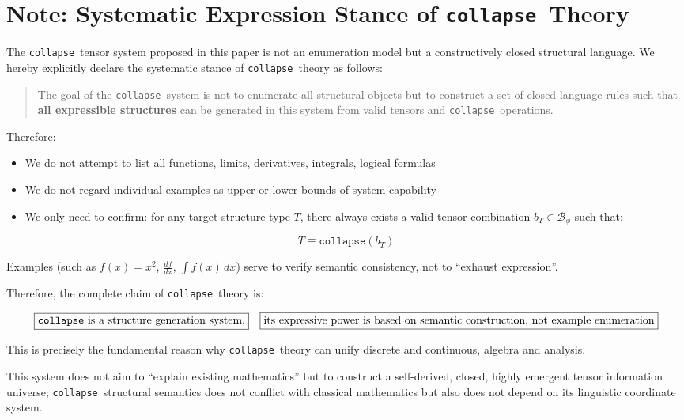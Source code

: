\documentclass[12pt,a4paper]{article}
\theoremstyle{plain}
\theoremstyle{definition}
\theoremstyle{remark}
\newcommand{\collapse}{\texttt{collapse}}
\newcommand{\Bphi}{\mathcal{B}_\phi}
\begin{document}
\section*{Note: Systematic Expression Stance of \collapse\ Theory}

The \collapse\ tensor system proposed in this paper is not an enumeration model but a constructively closed structural language. We hereby explicitly declare the systematic stance of \collapse\ theory as follows:

\begin{quote}
The goal of the \collapse\ system is not to enumerate all structural objects but to construct a set of closed language rules such that \textbf{all expressible structures} can be generated in this system from valid tensors and \collapse\ operations.
\end{quote}

Therefore:
\begin{itemize}
\item We do not attempt to list all functions, limits, derivatives, integrals, logical formulas
\item We do not regard individual examples as upper or lower bounds of system capability
\item We only need to confirm: for any target structure type $T$, there always exists a valid tensor combination $b_T \in \Bphi$ such that:
\end{itemize}

\begin{equation}
T \equiv \collapse(b_T)
\end{equation}

Examples (such as $f(x)=x^2$, $\frac{df}{dx}$, $\int f(x)\,dx$) serve to verify semantic consistency, not to ``exhaust expression''.

Therefore, the complete claim of \collapse\ theory is:

\begin{equation}
\boxed{
\text{\collapse\ is a structure generation system,}
}
\quad
\boxed{
\text{its expressive power is based on semantic construction, not example enumeration}
}
\end{equation}

This is precisely the fundamental reason why \collapse\ theory can unify discrete and continuous, algebra and analysis.

This system does not aim to ``explain existing mathematics'' but to construct a self-derived, closed, highly emergent tensor information universe;
\collapse\ structural semantics does not conflict with classical mathematics but also does not depend on its linguistic coordinate system.
\end{document}
